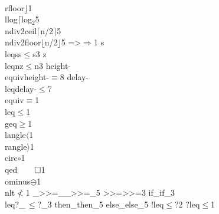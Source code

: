 {                        {\\rfloor}{{\(\rfloor\)}}1
                        {\\llog}{{\(\lceil\)log\(_2\)}}5
                        {\\ndiv2ceil}{{\(\lceil\)n/2\(\rceil\)}}5
                        {\\ndiv2floor}{{\(\lfloor\)n/2\(\rfloor\)}}5
                        {=>}{{\(\Rightarrow\)}}1
                        {s\\leqs}{{s\(\leq\)s}}3
                        {z\\leqn}{{z\(\leq\)n}}3
                        {height-\\equiv}{{{\symbolstyle height-\(\equiv\)}}}8
                        {delay-\\leq}{{{\symbolstyle delay-\(\leq\)}}}7
                        {\\equiv}{{\(\equiv\)}}1
                        {\\leq}{{\(\leq\)}}1
                        {\\geq}{{\(\geq\)}}1
                        {\\langle}{{\(\langle\)}}1
                        {\\rangle}{{\(\rangle\)}}1
                        {\\circ}{{\(\circ\)}}1
                        {\\qed}{{\(\qed\)}}1
                        {\\ominus}{{\(\ominus\)}}1
                        {\\nlt}{{\(\not<\)}}1
                        {\_>>=\_}{{{\symbolstyle \_>\/>=\_}}}5
                        {>>=}{{{\symbolstyle >\/>=}}}3
                        {if\_}{{{\symbolstyle if\_}}}3
                        {\\leq?\_}{{{\symbolstyle \,\(\leq\)?\_}}}3
                        {then\_}{{{\symbolstyle then\_}}}5
                        {else\_}{{{\symbolstyle else\_}}}5
                        {!leq}{{{\symbolstyle \(\leq\)?}}}2
                        {?leq}{{{\(\leq\)}}}1
}
\lstset{language=agda}